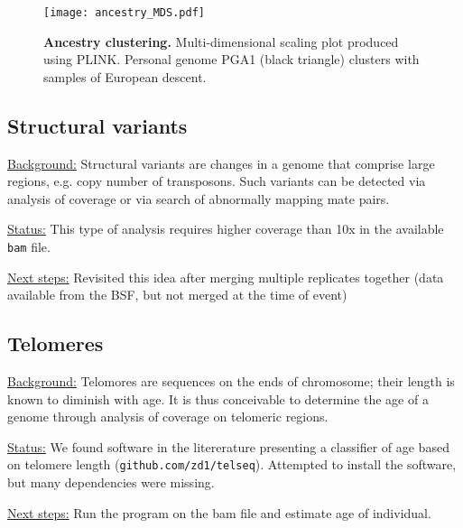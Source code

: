\documentclass[a4paper,11pt]{TKnotes}
\newcommand{\background}{\vspace*{0.3cm}\noindent\uline{Background:} }
\newcommand{\status}{\vspace*{0.3cm}\noindent\uline{Status:} }
\newcommand{\nextsteps}{\vspace*{0.3cm}\noindent\uline{Next steps:} }
\begin{document}
\begin{figure}[!htb] 
\vspace*{0.2cm}
  \begin{center}
\texttt{[image: ancestry\_MDS.pdf]} \vspace*{0.4cm} 
\vspace*{-1cm}
  \end{center}
  \caption{\label{ancestry}{\bf Ancestry clustering. } Multi-dimensional scaling plot produced using PLINK. Personal genome PGA1 (black triangle) clusters with samples of European descent. }
\end{figure}

\vspace*{0.5cm}
\subsection{Structural variants}

\background Structural variants are changes in a genome that comprise large regions, e.g. copy number of transposons. Such variants can be detected via analysis of coverage or via search of abnormally mapping mate pairs.

\status This type of analysis requires higher coverage than 10x in the available {\tt bam} file. 

\nextsteps Revisited this idea after merging multiple replicates together (data available from the BSF, but not merged at the time of event)



\vspace*{0.5cm}
\subsection{Telomeres}

\background Telomores are sequences on the ends of chromosome; their length is known to diminish with age. It is thus conceivable to determine the age of a genome through analysis of coverage on telomeric regions. 

\status We found software in the litererature presenting a classifier of age based on telomere length ({\tt github.com/zd1/telseq}). Attempted to install the software, but many dependencies were missing. 

\nextsteps Run the program on the bam file and estimate age of individual.



\vspace*{0.5cm}
\end{document}
